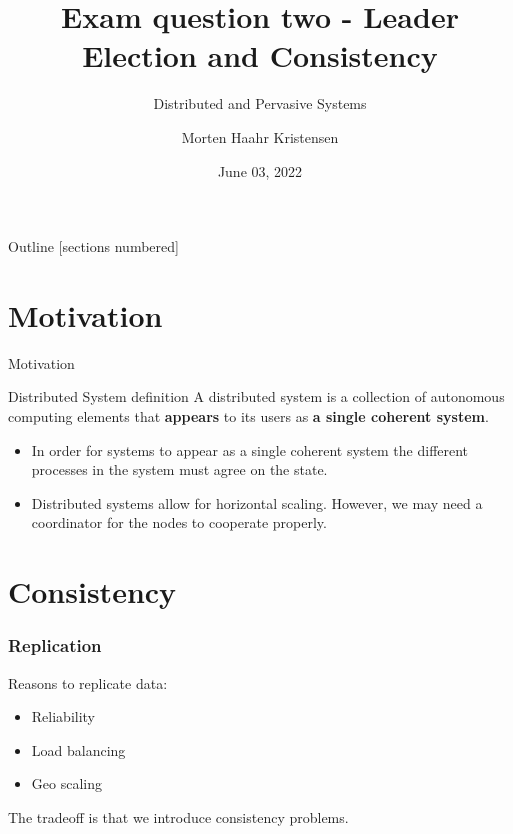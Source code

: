 \documentclass[10pt]{beamer}
\title[Leader Election and Consistency]{Exam question two - Leader Election and Consistency}
\subtitle{Distributed and Pervasive Systems}
\date{June 03, 2022}
\author[M.H. Kristensen]{Morten Haahr Kristensen}
\institute{Department of Electrical and Computer Engineering - Aarhus University}
\begin{document}
\maketitle

\begin{frame}{Outline}
  [sections numbered]
  \tableofcontents[hideallsubsections]
\end{frame}


\section{Motivation}

\begin{frame}{Motivation}
  \begin{alertblock}{Distributed System definition \cite{vansteenDistributedSystems2018}}
    A distributed system is a collection of autonomous computing elements that \textbf{appears} to its users as \textbf{a single coherent system}.
  \end{alertblock}
  \begin{itemize}
    \item In order for systems to appear as a single coherent system the different processes in the system must agree on the state.
    \item Distributed systems allow for horizontal scaling. However, we may need a coordinator for the nodes to cooperate properly.
  \end{itemize}
\end{frame}

\section{Consistency}
\begin{frame}
  \frametitle{Replication}
  Reasons to replicate data:
  \begin{itemize}
    \item Reliability
    \item Load balancing
    \item Geo scaling
  \end{itemize}
  The tradeoff is that we introduce consistency problems.
\end{frame}
\end{document}
